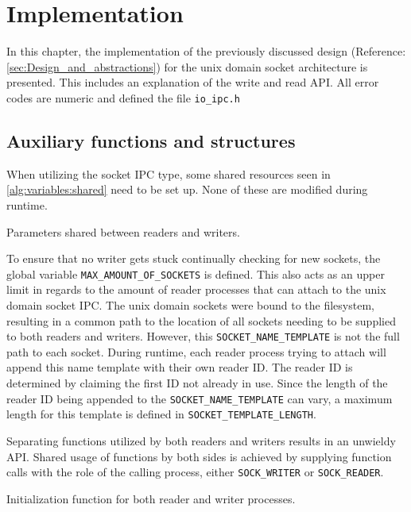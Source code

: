 %
%

\chapter{Implementation}
\label{cha:implementation}
In this chapter, the implementation of the previously discussed design (Reference\@: \ref{sec:Design_and_abstractions}) for the unix domain socket architecture is presented.
This includes an explanation of the write and read API.
All error codes are numeric and defined the file \texttt{io\_ipc.h}

\section{Auxiliary functions and structures}
When utilizing the socket IPC type, some shared resources seen in \ref{alg:variables:shared} need to be set up.
None of these are modified during runtime.

\begin{algorithm}[h!]
    
    \caption[Socket: Shared variables]{Parameters shared between readers and writers.}
    \label{alg:variables:shared}
\end{algorithm}

To ensure that no writer gets stuck continually checking for new sockets, the global variable \texttt{MAX\_AMOUNT\_OF\_SOCKETS} is defined.
This also acts as an upper limit in regards to the amount of reader processes that can attach to the unix domain socket IPC.
The unix domain sockets were bound to the filesystem, resulting in a common path to the location of all sockets needing to be supplied to both readers and writers.
However, this \texttt{SOCKET\_NAME\_TEMPLATE} is not the full path to each socket.
During runtime, each reader process trying to attach will append this name template with their own reader ID.
The reader ID is determined by claiming the first ID not already in use.
Since the length of the reader ID being appended to the \texttt{SOCKET\_NAME\_TEMPLATE} can vary, a maximum length for this template is defined in \texttt{SOCKET\_TEMPLATE\_LENGTH}.

Separating functions utilized by both readers and writers results in an unwieldy API.
Shared usage of functions by both sides is achieved by supplying function calls with the role of the calling process, either \texttt{SOCK\_WRITER} or \texttt{SOCK\_READER}.

\begin{algorithm}[h!]
    
    \caption[Socket: Socket initialization]{Initialization function for both reader and writer processes.}
    \label{alg:sock:init}
\end{algorithm}

